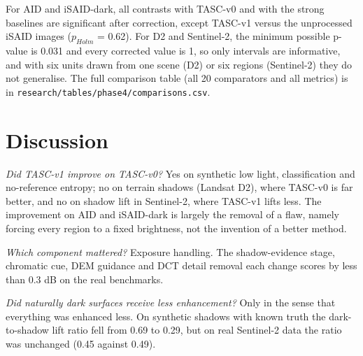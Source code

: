 \documentclass[conference]{IEEEtran}
\begin{document}
\begin{table}[t]
\caption{Principal paired contrasts, TASC-v1 C2 minus comparator (PSNR in dB). Intervals are 95 \% bootstrap intervals over the units.}
\label{tab:stat}
\centering\scriptsize
\setlength{\tabcolsep}{2.5pt}
\end{table}
For AID and iSAID-dark, all contrasts with TASC-v0 and with the strong baselines are significant after correction, except TASC-v1 versus the unprocessed iSAID images ($p_{Holm}$ = 0.62). For D2 and Sentinel-2, the minimum possible p-value is 0.031 and every corrected value is 1, so only intervals are informative, and with six units drawn from one scene (D2) or six regions (Sentinel-2) they do not generalise. The full comparison table (all 20 comparators and all metrics) is in \texttt{research/tables/phase4/comparisons.csv}.

\section{Discussion}
\emph{Did TASC-v1 improve on TASC-v0?} Yes on synthetic low light, classification and no-reference entropy; no on terrain shadows (Landsat D2), where TASC-v0 is far better, and no on shadow lift in Sentinel-2, where TASC-v1 lifts less. The improvement on AID and iSAID-dark is largely the removal of a flaw, namely forcing every region to a fixed brightness, not the invention of a better method.

\emph{Which component mattered?} Exposure handling. The shadow-evidence stage, chromatic cue, DEM guidance and DCT detail removal each change scores by less than 0.3 dB on the real benchmarks.

\emph{Did naturally dark surfaces receive less enhancement?} Only in the sense that everything was enhanced less. On synthetic shadows with known truth the dark-to-shadow lift ratio fell from 0.69 to 0.29, but on real Sentinel-2 data the ratio was unchanged (0.45 against 0.49).
\end{document}
